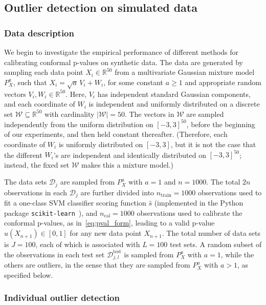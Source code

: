 \documentclass[11pt]{article}
\begin{document}
\subsection{Outlier detection on simulated data} \label{sec:exp_simulated}

\subsubsection{Data description}

We begin to investigate the empirical performance of different methods for calibrating conformal p-values on synthetic data. 
The data are generated by sampling each data point $X_i \in \mathbb{R}^{50}$ from a multivariate Gaussian mixture model $P_X^{a}$, such that $X_i = \sqrt{a} \, V_i + W_i$, for some constant $a\geq 1$ and appropriate random vectors $V_i,W_i \in \mathbb{R}^{50}$.
Here, $V_i$ has independent standard Gaussian components, and each coordinate of $W_i$ is independent and uniformly distributed on a discrete set $\mathcal{W} \subseteq \mathbb{R}^{50}$ with cardinality $|\mathcal{W}|=50$.
The vectors in $\mathcal{W}$ are sampled independently from the uniform distribution on $[-3,3]^{50}$, before the beginning of our experiments, and then held constant thereafter. (Therefore, each coordinate of $W_i$ is uniformly distributed on $[-3,3]$, but it is not the case that the different $W_i$'s are independent and identically distributed on $[-3,3]^{50}$; instead, the fixed set $\mathcal{W}$ makes this a mixture model.)

The data sets $\mathcal{D}_j$ are sampled from $P_X^{a}$ with $a=1$ and $n=1000$.
The total $2n$ observations in each $\mathcal{D}_j$ are further divided into $n_{\text{train}}=1000$ observations used to fit a one-class SVM classifier scoring function $\hat{s}$ (implemented in the Python package \texttt{scikit-learn}~\cite{scikit-learn}), and $n_{\text{cal}}=1000$ observations used to calibrate the conformal p-values, as in~\eqref{eq:pval_form}, leading to a valid p-value $\hat{u}(X_{n+1}) \in [0,1]$ for any new data point $X_{n+1}$.
The total number of data sets is $J=100$, each of which is associated with $L=100$ test sets.
A random subset of the observations in each test set $\mathcal{D}^{\mathrm{test}}_{j,l}$ is sampled from $P_X^{a}$ with $a=1$, while the others are outliers, in the sense that they are sampled from $P_X^{a}$ with $a>1$, as specified below.

\subsubsection{Individual outlier detection}
\label{sec:simulated_individual_outlier_detection}
\end{document}
